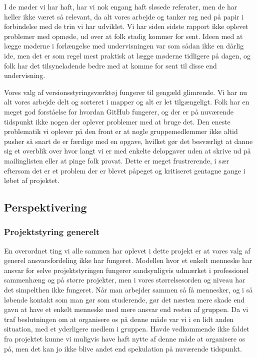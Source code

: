 \documentclass[10pt,a4paper,danish]{article}
\begin{document}
I de møder vi har haft, har vi nok engang haft sløsede referater, men de har
heller ikke været så relevant, da alt vores arbejde og tanker røg ned på papir
i forbindelse med de trin vi har udviklet. Vi har
siden sidste rapport ikke oplevet problemer med opmøde, ud over at folk stadig
kommer for sent. Ideen med at lægge møderne i forlængelse med undervisningen
var som sådan ikke en dårlig ide, men det er som regel mest praktisk at lægge
møderne tidligere på dagen, og folk har det tilsyneladende bedre med at komme
for sent til disse end undervisning. 

Vores valg af versionsstyringsværktøj fungerer til gengæld glimrende. Vi har nu alt vores
arbejde delt og sorteret i mapper og alt er let tilgængeligt. Folk har en meget
god forståelse for hvordan GitHub fungerer, og der er på nuværende tidspunkt ikke
nogen der oplever problemer med at bruge det. Den eneste problematik vi oplever 
på den front er at nogle gruppemedlemmer ikke altid pusher så snart de er færdige 
med en opgave, hvilket gør det besværligt at danne sig et overblik over hvor langt 
vi er med enkelte delopgaver uden at skrive ud på mailinglisten eller at pinge folk
provat. Dette er meget frustrerende, i sær eftersom det er et problem der er blevet
påpeget og kritiseret gentagne gange i løbet af projektet. 

\subsection{Perspektivering}
\subsubsection{Projektstyring generelt}
En overordnet ting vi alle sammen har oplevet i dette projekt er at vores valg
af generel ansvarsfordeling ikke har fungeret. Modellen hvor et enkelt menneske
har ansvar for selve projektstyringen fungerer sandsynligvis udmærket i professionel
sammenhæng og på større projekter, men i vores størrelsesorden og niveau har det
simpelthen ikke fungeret. Når man arbejder sammen så få mennesker, og i så løbende 
kontakt som man gør som studerende, gør det næsten mere skade end gavn at have et 
enkelt menneske med mere ansvar end resten af gruppen. Da vi traf beslutningen om 
at organisere os på denne måde var vi i en lidt anden situation, med et yderligere 
medlem i gruppen. Havde vedkommende ikke faldet fra projektet kunne vi muligvis
have haft nytte af denne måde at organisere os på, men det kan jo ikke blive andet
end spekulation på nuværende tidspunkt. 
\end{document}
